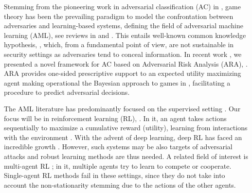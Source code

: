 Stemming from the pioneering work in adversarial classification (AC) in
\cite{dalvi2004adversarial}, 
 game theory \cite{menache2011network}
 has been the prevailing paradigm to model the confrontation
between adversaries and learning-based systems, 
defining the field of adversarial machine learning (AML),
 see reviews in 
\cite{BIGGIO2018317} and \cite{doi:10.1002/widm.1259}. This entails
well-known common
knowledge hypothesis, \cite{hargreaves2004game}, which, from
a fundamental point of view, are  not sustainable in 
security settings 
as adversaries tend to %
conceal information. %
In recent work \cite{naveiro2018adversarial}, we presented a novel 
framework for AC based on Adversarial Risk Analysis (ARA), \cite{roponen}.
ARA provides one-sided prescriptive
support to an expected utility maximizing agent
 making operational the Bayesian approach to games in \cite{kadane1982subjective, raiffa1982art}, facilitating a procedure to
predict adversarial decisions. 

The AML literature has predominantly focused on
the supervised setting \cite{BIGGIO2018317}.
Our focus will be in reinforcement learning (RL), \cite{sutton2012reinforcement}.
In it, an agent takes actions
sequentially to maximize a cumulative reward (utility), learning from
interactions with the environment \cite{kaelbling1996reinforcement}. With the advent of deep learning, deep RL
has faced an incredible growth
\cite{mnih2015human,silver2017mastering,chinorros}. 
However, such systems may be also targets of 
adversarial attacks \cite{huang2017adversarial,lin2017tactics} 
and robust learning methods are thus
needed. 
A related field of interest is multi-agent RL \cite{marl_over,leelee};
in it, multiple 
agents try to learn to compete or cooperate. Single-agent RL methods fail in
these settings, since they do not take into account 
the non-stationarity 
stemming due to the actions of the other agents. %

